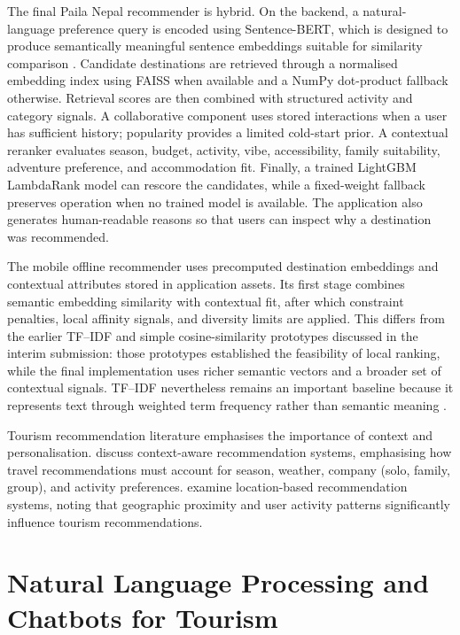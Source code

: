 \documentclass[12pt,a4paper,oneside]{report}
\begin{document}
The final Paila Nepal recommender is hybrid. On the backend, a natural-language preference query is encoded using Sentence-BERT, which is designed to produce semantically meaningful sentence embeddings suitable for similarity comparison \parencite{Reimers2019}. Candidate destinations are retrieved through a normalised embedding index using FAISS when available and a NumPy dot-product fallback otherwise. Retrieval scores are then combined with structured activity and category signals. A collaborative component uses stored interactions when a user has sufficient history; popularity provides a limited cold-start prior. A contextual reranker evaluates season, budget, activity, vibe, accessibility, family suitability, adventure preference, and accommodation fit. Finally, a trained LightGBM LambdaRank model can rescore the candidates, while a fixed-weight fallback preserves operation when no trained model is available. The application also generates human-readable reasons so that users can inspect why a destination was recommended.

The mobile offline recommender uses precomputed destination embeddings and contextual attributes stored in application assets. Its first stage combines semantic embedding similarity with contextual fit, after which constraint penalties, local affinity signals, and diversity limits are applied. This differs from the earlier TF--IDF and simple cosine-similarity prototypes discussed in the interim submission: those prototypes established the feasibility of local ranking, while the final implementation uses richer semantic vectors and a broader set of contextual signals. TF--IDF nevertheless remains an important baseline because it represents text through weighted term frequency rather than semantic meaning \parencite{Salton1988}.

Tourism recommendation literature emphasises the importance of context and personalisation. \cite{Tkalcic2019} discuss context-aware recommendation systems, emphasising how travel recommendations must account for season, weather, company (solo, family, group), and activity preferences. \cite{Ye2010} examine location-based recommendation systems, noting that geographic proximity and user activity patterns significantly influence tourism recommendations.

\section{Natural Language Processing and Chatbots for Tourism}
\label{sec:nlp_chatbots}
\end{document}
